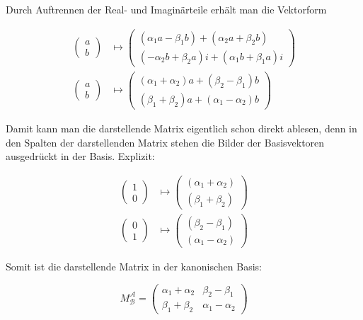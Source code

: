 \documentclass[a4paper,german,12pt,smallheadings]{scrartcl}
\begin{document}
Durch Auftrennen der Real- und Imaginärteile erhält man die Vektorform

\begin{align*}
  \begin{pmatrix} a \\ b \end{pmatrix} &\mapsto \begin{pmatrix} (\alpha_1a-\beta_1b) + (\alpha_2a+\beta_2b) \\ (-\alpha_2b+\beta_2a)i + (\alpha_1b + \beta_1a)i \end{pmatrix} \\
  \begin{pmatrix} a \\ b \end{pmatrix} &\mapsto \begin{pmatrix} (\alpha_1+\alpha_2)a + (\beta_2 - \beta_1)b \\ (\beta_1+\beta_2)a + (\alpha_1-\alpha_2)b \end{pmatrix}
\end{align*}

Damit kann man die darstellende Matrix eigentlich schon direkt ablesen, denn in
den Spalten der darstellenden Matrix stehen die Bilder der Basisvektoren
ausgedrückt in der Basis. Explizit:

\begin{align*}
  \begin{pmatrix} 1 \\ 0 \end{pmatrix} &\mapsto \begin{pmatrix} (\alpha_1+\alpha_2) \\ (\beta_1+\beta_2) \end{pmatrix} \\
  \begin{pmatrix} 0 \\ 1 \end{pmatrix} &\mapsto \begin{pmatrix} (\beta_2 - \beta_1) \\ (\alpha_1-\alpha_2) \end{pmatrix}
\end{align*}

Somit ist die darstellende Matrix in der kanonischen Basis:

\begin{equation}
  M_{\mathcal{B}}^{\mathcal{A}} = \begin{pmatrix} \alpha_1+\alpha_2 & \beta_2 - \beta_1 \\ \beta_1+\beta_2 & \alpha_1-\alpha_2 \end{pmatrix}
\end{equation}
\end{document}
